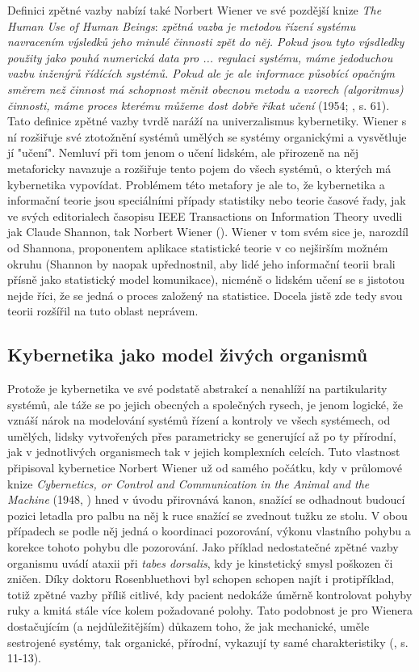\documentclass[11pt,a4paper]{article}
\begin{document}
Definici zpětné vazby nabízí také Norbert Wiener ve své pozdější knize \textit{The Human Use of Human Beings}: \textit{zpětná vazba je metodou řízení systému navracením výsledků jeho minulé činnosti zpět do něj. Pokud jsou tyto výsdledky použity jako pouhá numerická data pro ... regulaci systému, máme jedoduchou vazbu inženýrů řídících systémů. Pokud ale je ale informace působící opačným směrem než činnost má schopnost měnit obecnou metodu a vzorech (algoritmus) činnosti, máme proces kterému můžeme dost dobře říkat učení} (1954; \cite{wiener_human_1989}, s. 61). Tato definice zpětné vazby tvrdě naráží na univerzalismus kybernetiky. Wiener s ní rozšiřuje své ztotožnění systémů umělých se systémy organickými a vysvětluje jí "učení". Nemluví při tom jenom o učení lidském, ale přirozeně na něj metaforicky navazuje a rozšiřuje tento pojem do všech systémů, o kterých má kybernetika vypovídat. Problémem této metafory je ale to, že kybernetika a informační teorie jsou speciálními případy statistiky nebo teorie časové řady, jak ve svých editorialech časopisu IEEE Transactions on Information Theory uvedli jak Claude Shannon, tak Norbert Wiener (\cite{shannon_bandwagon_1956, wiener_what_1956}). Wiener v tom svém sice je, narozdíl od Shannona, proponentem aplikace statistické teorie v co nejširším možném okruhu (Shannon by naopak upřednostnil, aby lidé jeho informační teorii brali přísně jako statistický model komunikace), nicméně o lidském učení se s jistotou nejde říci, že se jedná o proces založený na statistice. Docela jistě zde tedy svou teorii rozšířil na tuto oblast neprávem. 


\subsection{Kybernetika jako model živých organismů}

Protože je kybernetika ve své podstatě abstrakcí a nenahlíží na partikularity systémů, ale táže se po jejich obecných a společných rysech, je jenom logické, že vznáší nárok na modelování systémů řízení a kontroly ve všech systémech, od umělých, lidsky vytvořených přes parametricky se generující až po ty přírodní, jak v jednotlivých organismech tak v jejich komplexních celcích. Tuto vlastnost připisoval kybernetice Norbert Wiener už od samého počátku, kdy v průlomové knize \textit{Cybernetics, or Control and Communication in the Animal and the Machine} (1948, \cite{wiener_cybernetics_2019}) hned v úvodu přirovnává kanon, snažící se odhadnout budoucí pozici letadla pro palbu na něj k ruce snažící se zvednout tužku ze stolu. V obou případech se podle něj jedná o koordinaci pozorování, výkonu vlastního pohybu a korekce tohoto pohybu dle pozorování. Jako příklad nedostatečné zpětné vazby organismu uvádí ataxii při \textit{tabes dorsalis}, kdy je kinstetický smysl poškozen či zničen. Díky doktoru Rosenbluethovi byl schopen schopen najít i protipříklad, totiž zpětné vazby příliš citlivé, kdy pacient nedokáže úměrně kontrolovat pohyby ruky a kmitá stále více kolem požadované polohy. Tato podobnost je pro Wienera dostačujícím (a nejdůležitějším) důkazem toho, že jak mechanické, uměle sestrojené systémy, tak organické, přírodní, vykazují ty samé charakteristiky (\cite{wiener_cybernetics_2019}, s. 11-13). 
\end{document}
